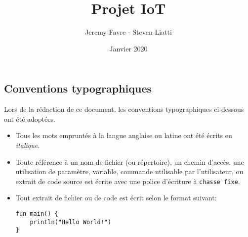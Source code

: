 \documentclass[a4paper, 12pt]{article}
\newenvironment{code}{\captionsetup{type=listing}}{}
\begin{document}
\title{Projet IoT}
\author{Jeremy Favre - Steven Liatti}
\date{Janvier 2020}
\maketitle
\newpage


\tableofcontents
{}
\listoffigures
\newpage
\renewcommand\listoflistingscaption{Table des listings de code source}
\listoflistings

\subsection*{Conventions typographiques} %
Lors de la rédaction de ce document, les conventions typographiques ci-dessous ont
été adoptées.
\begin{itemize}[label=\textbullet]
	\item Tous les mots empruntés à la langue anglaise ou latine ont été écrits en \textit{italique}.
	\item Toute référence à un nom de fichier (ou répertoire), un chemin d'accès, une 
    utilisation de paramètre, variable, commande utilisable par l'utilisateur, ou extrait de code 
    source est écrite avec une police d'écriture à \texttt{chasse fixe}.
	\item Tout extrait de fichier ou de code est écrit selon le format suivant:
    \bigbreak
    \begin{code}
        \begin{verbatim}
fun main() {
    println("Hello World!")
}
        \end{verbatim}
    \end{code}
\end{itemize}
\end{document}
